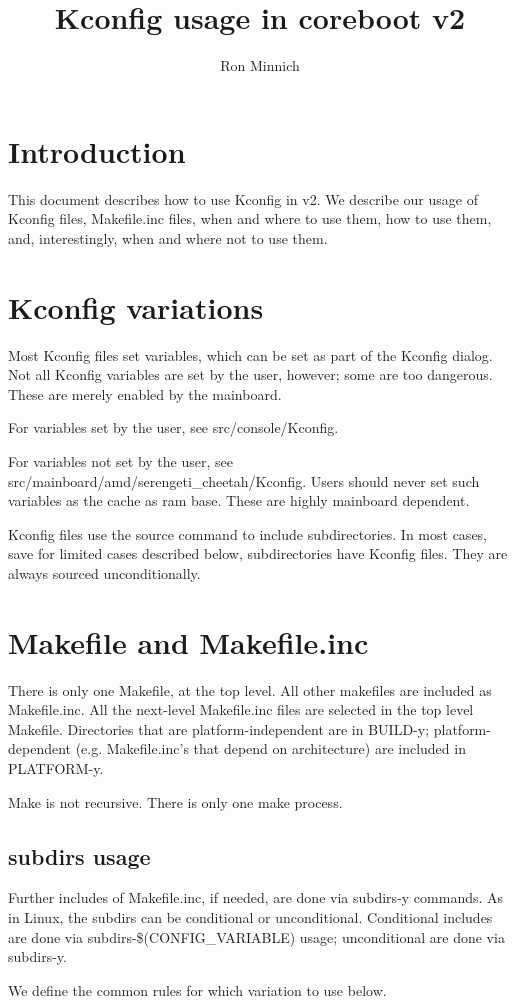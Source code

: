 \documentclass[10pt,letterpaper]{article}
\author{Ron Minnich}
\title{Kconfig usage in coreboot v2}
\begin{document}
\section{Introduction}
This document describes how to use Kconfig in v2. We describe our usage of Kconfig files, Makefile.inc files, when and where to use them, how to use them, and, interestingly, when and where not to use them.
\section{Kconfig variations}
Most Kconfig files set variables, which can be set as part of the Kconfig dialog. Not all Kconfig variables are set by the user, however; some are too dangerous. These are merely enabled by the mainboard.

For variables set by the user, see src/console/Kconfig.

For variables not set by the user, see src/mainboard/amd/serengeti\_cheetah/Kconfig. Users should never set such variables as the cache as ram base. These are highly mainboard dependent.

Kconfig files use the source command to include subdirectories. In most cases, save for limited cases described below, subdirectories have Kconfig files. They are always sourced unconditionally.

\section{Makefile and Makefile.inc}
There is only one Makefile, at the top level. All other makefiles are included as Makefile.inc. All the next-level Makefile.inc files are selected in the top level Makefile. Directories that are platform-independent are in BUILD-y; platform-dependent (e.g. Makefile.inc's that depend on architecture) are included in PLATFORM-y.

Make is not recursive. There is only one make process.
\subsection{subdirs usage}
Further includes of Makefile.inc, if needed, are done via subdirs-y commands. As in Linux, the subdirs can be conditional or unconditional. Conditional includes are done via subdirs-\$(CONFIG\_VARIABLE) usage; unconditional are done via subdirs-y.

We define the common rules for which variation to use below.
\end{document}

